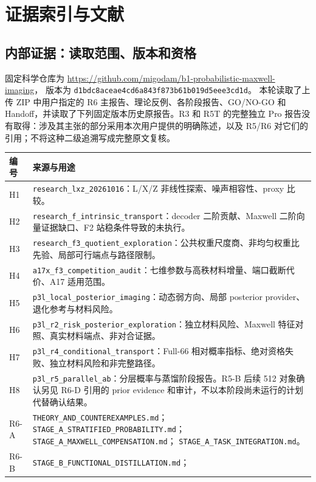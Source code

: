 \clearpage
\section{证据索引与文献}
\subsection{内部证据：读取范围、版本和资格}
固定科学仓库为 \url{https://github.com/migodam/b1-probabilistic-maxwell-imaging}，
版本为 \texttt{d1bdc8aceae4cd6a843f873b61b019d5eee3cd1d}。
本轮读取了上传 ZIP 中用户指定的 R6 主报告、理论反例、各阶段报告、GO/NO-GO 和 Handoff，并读取了下列固定版本历史原报告。R3 和 R5T 的完整独立 Pro 报告没有取得：涉及其主张的部分采用本次用户提供的明确陈述，以及 R5/R6 对它们的引用；不将这种二级追溯写成完整原文复核。
\begin{longtable}{p{.08\linewidth}p{.84\linewidth}}
\toprule 编号 & 来源与用途\\\midrule\endhead
H1 & \texttt{research\_lxz\_20261016}：L/X/Z 非线性探索、噪声相容性、proxy 比较。\\
H2 & \texttt{research\_f\_intrinsic\_transport}：decoder 二阶贡献、Maxwell 二阶向量证据缺口、F2 站稳条件导致的未执行。\\
H3 & \texttt{research\_f3\_quotient\_exploration}：公共权重尺度商、非均匀权重比先验、局部可行端点与路径限制。\\
H4 & \texttt{a17x\_f3\_competition\_audit}：七维参数与高秩材料增量、端口截断代价、A17 适用范围。\\
H5 & \texttt{p3l\_local\_posterior\_imaging}：动态弱方向、局部 posterior provider、退化参考与材料风险。\\
H6 & \texttt{p3l\_r2\_risk\_posterior\_exploration}：独立材料风险、Maxwell 特征对照、真实材料端点、非对合证据。\\
H7 & \texttt{p3l\_r4\_conditional\_transport}：Full-66 相对概率指标、绝对资格失败、独立材料风险和非完整路径。\\
H8 & \texttt{p3l\_r5\_parallel\_ab}：分层概率与蒸馏阶段报告。R5-B 后续 512 对象确认另见 R6-D 引用的 prior evidence 和审计，不以本阶段尚未运行的计划代替确认结果。\\
R6-A & \texttt{THEORY\_AND\_COUNTEREXAMPLES.md}；\newline 
\texttt{STAGE\_A\_STRATIFIED\_PROBABILITY.md}；\newline 
\texttt{STAGE\_A\_MAXWELL\_COMPENSATION.md}；\newline 
\texttt{STAGE\_A\_TASK\_INTEGRATION.md}。\\
R6-B & \texttt{STAGE\_B\_FUNCTIONAL\_DISTILLATION.md}；\newline 

\end{longtable}
